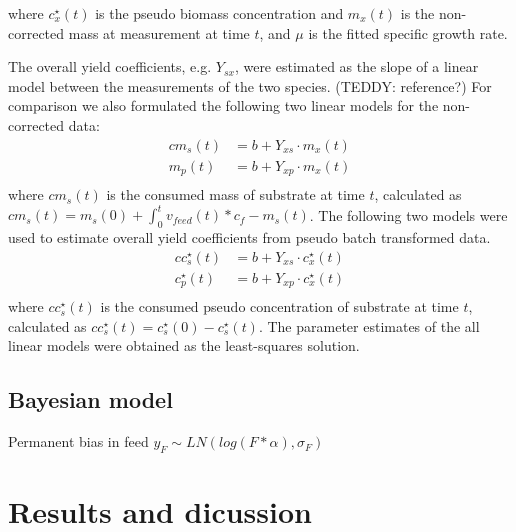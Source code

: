 \documentclass{bioinfo}
\begin{document}
\begin{methods}
where $c^{\star}_x(t)$ is the pseudo biomass concentration and $m_x(t)$ is the non-corrected mass at measurement at time $t$, and $\mu$ is the fitted specific growth rate.

The overall yield coefficients, e.g. $Y_{sx}$, were estimated as the slope of a linear model between the measurements of the two species. (TEDDY: reference?) For comparison we also formulated the following two linear models for the non-corrected data: 
\begin{align}
    cm_s(t) &= b + Y_{xs} \cdot m_x(t) \\
    m_p(t) &= b + Y_{xp} \cdot m_x(t) \\
\end{align}
where $cm_s(t)$ is the consumed mass of substrate at time $t$, calculated as $cm_s(t) = m_s(0) + \int_0^t v_{feed}(t) * c_f - m_s(t)$. The following two models were used to estimate overall yield coefficients from pseudo batch transformed data.
\begin{align}
    cc^{\star}_s(t) &= b + Y_{xs} \cdot c^{\star}_x(t) \\
    c^{\star}_p(t) &= b + Y_{xp} \cdot c^{\star}_x(t) \\
\end{align}
where $cc^{\star}_s(t)$ is the consumed pseudo concentration of substrate at time $t$, calculated as $cc^{\star}_s(t) = c^{\star}_s(0)- c^{\star}_s(t)$. The parameter estimates of the all linear models were obtained as the least-squares solution.


\end{methods}



\subsection{Bayesian model}
Permanent bias in feed
$y_F \sim LN(log(F * \alpha), \sigma_F)$

\section{Results and dicussion}
\end{document}

